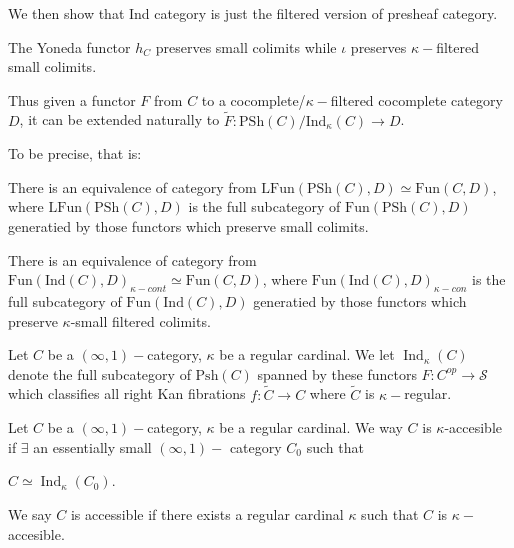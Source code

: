 We then show that Ind category is just the filtered version of presheaf category.


\begin{proposition}
    The Yoneda functor $h_C$ preserves small colimits while $\iota$ preserves $\kappa-$filtered small colimits.
\end{proposition}

Thus given a functor $F$ from $C$ to a cocomplete/$\kappa-$filtered cocomplete category $D$, it can be extended naturally to $\widetilde{F}:\text{PSh}(C)/\text{Ind}_\kappa(C)\to D$.

To be precise, that is:

\begin{theorem}
    There is an equivalence of category from $\text{LFun}(\text{PSh}(C),D)\simeq \text{Fun}(C,D)$, where $\text{LFun}(\text{PSh}(C),D)$ is the full subcategory of $\text{Fun}(\text{PSh}(C),D)$ generatied by those functors which preserve small colimits.
\end{theorem}

\begin{theorem}
    There is an equivalence of category from $\text{Fun}(\text{Ind}(C),D)_{\kappa-cont}\simeq \text{Fun}(C,D)$, where $\text{Fun}(\text{Ind}(C),D)_{\kappa-con}$ is the full subcategory of $\text{Fun}(\text{Ind}(C),D)$ generatied by those functors which preserve $\kappa$-small filtered colimits.
\end{theorem}

\begin{definition}
    Let $C$ be a $(\infty,1)-$category, $\kappa$ be a regular cardinal. We let $\operatorname{Ind}_\kappa(C)$ denote the full subcategory of $\text{Psh}(C)$ spanned by these functors $F:C^{op}\to \mathscr{S}$ which classifies all right Kan fibrations $f: \tilde{C}\to C$ where $\tilde{C} $ is $\kappa-$regular.
    
\end{definition}

\begin{definition}
    Let $C$ be a $(\infty,1)-$category, $\kappa$ be a regular cardinal. We way $C$ is $\kappa$-accesible if $\exists $ an essentially small $(\infty,1)-$ category $C_0$ such that

    $C\simeq \operatorname{Ind}_\kappa(C_0)$.

    We say $C$ is accessible if there exists a regular cardinal $\kappa$ such that $C$ is $\kappa-$accesible.

\end{definition}


